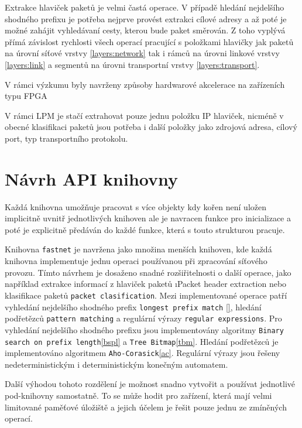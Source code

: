 Extrakce hlaviček paketů je velmi častá operace.
V případě hledání nejdelšího shodného prefixu je potřeba nejprve provést extrakci
cílové adresy a až poté je možné zahájit vyhledávaní cesty, kterou bude paket směrován.
Z toho vyplývá přímá závislost rychlosti všech operací pracující s položkami hlavičky jak paketů
na úrovní síťové vrstvy \ref{layers:network} tak i rámců na úrovni linkové vrstvy \ref{layers:link}
a segmentů na úrovni transportní vrstvy \ref{layers:transport}.

V rámci výzkumu byly navrženy způsoby hardwarové akcelerace na zařízeních typu FPGA \cite{ant-phe}

V rámci LPM je stačí extrahovat pouze jednu položku IP hlaviček,
nicméně v obecné klasifikaci paketů jsou potřeba i další položky jako zdrojová adresa,
cílový port, typ transportního protokolu.



\chapter{Návrh API knihovny}\label{chapter:api} %

Každá knihovna umožňuje pracovat s více objekty kdy kořen není uložen implicitně
uvnitř jednotlivých knihoven ale je navracen funkce pro inicializace a poté je explicitně
předáván do každé funkce, která s touto strukturou pracuje.

Knihovna \texttt{fastnet} je navržena jako množina menších knihoven, kde každá knihovna implementuje
jednu operaci používanou při zpracování síťového provozu.
Tímto návrhem je dosaženo snadné rozšiřitelnosti o další operace, jako například extrakce informací z hlaviček paketů
\i{Packet header extraction} nebo klasifikace paketů \texttt{packet clasification}.
Mezi implementované operace patří vyhledání nejdelšího shodného prefix \texttt{longest prefix match} \ref{},
hledání podřetězců \texttt{pattern matching} a regulární výrazy \texttt{regular expressions}.
Pro vyhledání nejdelšího shodného prefixu jsou implementovány algoritmy
\texttt{Binary search on prefix length}\ref{bspl} a \texttt{Tree Bitmap}\ref{tbm}.
Hledání podřetězců je implementováno algoritmem \texttt{Aho-Corasick}\ref{ac}.
Regulární výrazy jsou řešeny nedeterministickým i deterministickým konečným automatem.

Další výhodou tohoto rozdělení je možnost snadno vytvořit a používat jednotlivé pod-knihovny samostatně.
To se může hodit pro zařízení, která mají velmi limitované paměťové úložiště a jejich účelem
je řešit pouze jednu ze zmíněných operací.

